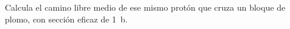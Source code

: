 \documentclass[./../main.tex]{subfiles}
\begin{document}
    \begin{exercise}
        Calcula el camino libre medio de ese mismo protón que cruza un bloque de plomo, con sección eficaz de \qty{1}{\barn}.
    \end{exercise}
\end{document}
